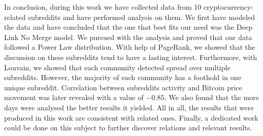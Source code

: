 In conclusion, during this work we have collected data from 10 cryptocurrency-related subreddits and have performed analysis on them. We first have modeled the data and have concluded that the one that best fits our need was the Deep Link No Merge model. We pursued with the analysis and proved that our data followed a Power Law distribution. With help of PageRank, we showed that the discussion on these subreddits tend to have a lasting interest. Furthermore, with Louvain, we showed that each community detected spread over multiple subreddits. However, the majority of each community has a foothold in one unique subreddit. Correlation between subreddits activity and Bitcoin price movement was later revealed with a value of $-0.85$. We also found that the more days were analysed the better results it yielded. All in all, the results that were produced in this work are consistent with related ones. Finally, a dedicated work could be done on this subject to further discover relations and relevant results.
